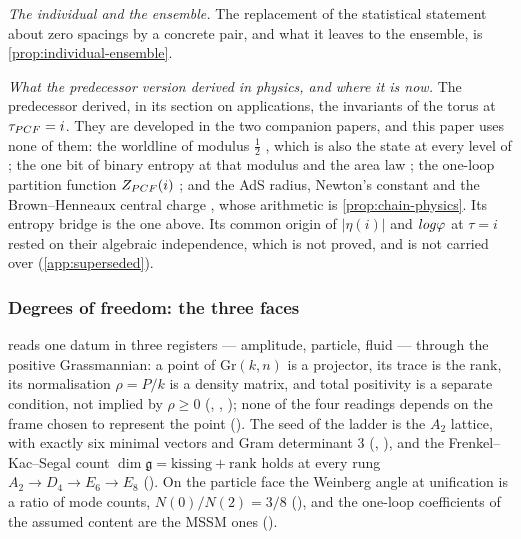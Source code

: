 \emph{The individual and the ensemble.}  The replacement of the statistical statement
about zero spacings by a concrete pair, and what it leaves to the ensemble, is
\cref{prop:individual-ensemble}.

\emph{What the predecessor version derived in physics, and where it is now.}  The predecessor
\cite{gonzalez26oddzeta} derived, in its section on applications, the invariants of the torus at
$\tau_{PCF}=i$.  They are developed in the two companion papers, and this paper uses none of them: the
worldline of modulus $\tfrac12$ \cite[\S3.1]{gonzalez26cw}, which is also the state at every level of
\cite[\S4]{gonzalez26ds}; the one bit of binary entropy at that modulus and the area law
\cite[\S3.2]{gonzalez26cw}; the one-loop partition function $Z_{PCF}(i)$ \cite[\S\S2.9, 3.3]{gonzalez26cw};
and the AdS radius, Newton's constant and the Brown--Henneaux central charge \cite[\S3.4]{gonzalez26cw},
whose arithmetic is \cref{prop:chain-physics}.  Its entropy bridge is the one above.  Its common origin of
$|\eta(i)|$ and $log\varphi$ at $\tau=i$ rested on their algebraic independence, which is not proved, and is
not carried over (\cref{app:superseded}).

\subsubsection{Degrees of freedom: the three faces}\label{sec:dof}

\cite[\S5]{gonzalez26cw} reads one datum in three registers --- amplitude,
particle, fluid --- through the positive Grassmannian: a point of
$\mathrm{Gr}(k,n)$ is a projector, its trace is the rank, its normalisation
$\rho=P/k$ is a density matrix, and total positivity is a separate condition, not
implied by $\rho\ge0$  (,
, );
none of the four readings depends on the frame chosen to represent the point
 ().  The seed of the ladder is the
$A_2$ lattice, with exactly six minimal vectors and Gram determinant $3$ 
(, ),
and the Frenkel--Kac--Segal count
$\dim\mathfrak g=\text{kissing}+\text{rank}$ holds at every rung
$A_2\to D_4\to E_6\to E_8$ 
().  On the particle face the Weinberg angle at unification is a ratio of
mode counts, $N(0)/N(2)=3/8$  (), and the
one-loop coefficients of the assumed content are the MSSM ones 
().

